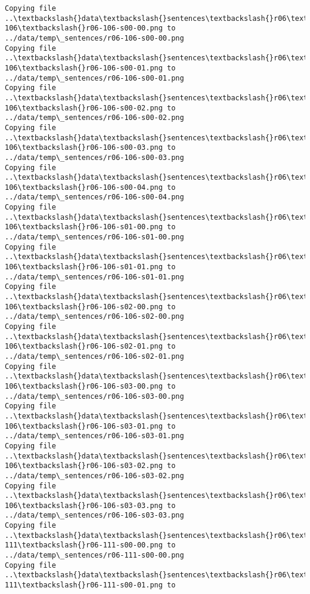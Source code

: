 \documentclass[11pt]{article}
\begin{document}
\begin{Verbatim}[commandchars=\\\{\}]
Copying file ..\textbackslash{}data\textbackslash{}sentences\textbackslash{}r06\textbackslash{}r06-106\textbackslash{}r06-106-s00-00.png to
../data/temp\_sentences/r06-106-s00-00.png
Copying file ..\textbackslash{}data\textbackslash{}sentences\textbackslash{}r06\textbackslash{}r06-106\textbackslash{}r06-106-s00-01.png to
../data/temp\_sentences/r06-106-s00-01.png
Copying file ..\textbackslash{}data\textbackslash{}sentences\textbackslash{}r06\textbackslash{}r06-106\textbackslash{}r06-106-s00-02.png to
../data/temp\_sentences/r06-106-s00-02.png
Copying file ..\textbackslash{}data\textbackslash{}sentences\textbackslash{}r06\textbackslash{}r06-106\textbackslash{}r06-106-s00-03.png to
../data/temp\_sentences/r06-106-s00-03.png
Copying file ..\textbackslash{}data\textbackslash{}sentences\textbackslash{}r06\textbackslash{}r06-106\textbackslash{}r06-106-s00-04.png to
../data/temp\_sentences/r06-106-s00-04.png
Copying file ..\textbackslash{}data\textbackslash{}sentences\textbackslash{}r06\textbackslash{}r06-106\textbackslash{}r06-106-s01-00.png to
../data/temp\_sentences/r06-106-s01-00.png
Copying file ..\textbackslash{}data\textbackslash{}sentences\textbackslash{}r06\textbackslash{}r06-106\textbackslash{}r06-106-s01-01.png to
../data/temp\_sentences/r06-106-s01-01.png
Copying file ..\textbackslash{}data\textbackslash{}sentences\textbackslash{}r06\textbackslash{}r06-106\textbackslash{}r06-106-s02-00.png to
../data/temp\_sentences/r06-106-s02-00.png
Copying file ..\textbackslash{}data\textbackslash{}sentences\textbackslash{}r06\textbackslash{}r06-106\textbackslash{}r06-106-s02-01.png to
../data/temp\_sentences/r06-106-s02-01.png
Copying file ..\textbackslash{}data\textbackslash{}sentences\textbackslash{}r06\textbackslash{}r06-106\textbackslash{}r06-106-s03-00.png to
../data/temp\_sentences/r06-106-s03-00.png
Copying file ..\textbackslash{}data\textbackslash{}sentences\textbackslash{}r06\textbackslash{}r06-106\textbackslash{}r06-106-s03-01.png to
../data/temp\_sentences/r06-106-s03-01.png
Copying file ..\textbackslash{}data\textbackslash{}sentences\textbackslash{}r06\textbackslash{}r06-106\textbackslash{}r06-106-s03-02.png to
../data/temp\_sentences/r06-106-s03-02.png
Copying file ..\textbackslash{}data\textbackslash{}sentences\textbackslash{}r06\textbackslash{}r06-106\textbackslash{}r06-106-s03-03.png to
../data/temp\_sentences/r06-106-s03-03.png
Copying file ..\textbackslash{}data\textbackslash{}sentences\textbackslash{}r06\textbackslash{}r06-111\textbackslash{}r06-111-s00-00.png to
../data/temp\_sentences/r06-111-s00-00.png
Copying file ..\textbackslash{}data\textbackslash{}sentences\textbackslash{}r06\textbackslash{}r06-111\textbackslash{}r06-111-s00-01.png to

\end{Verbatim}
\end{document}
